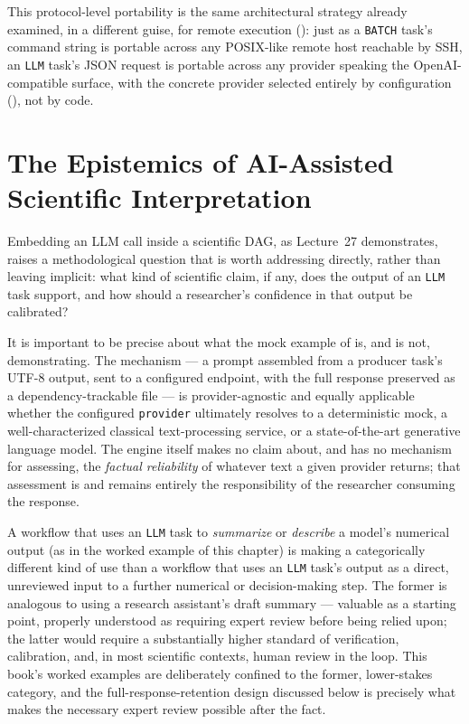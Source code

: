 \begin{practicebox}
This protocol-level portability is the same architectural strategy already
examined, in a different guise, for remote execution
(): just as a \texttt{BATCH} task's command
string is portable across any POSIX-like remote host reachable by SSH, an
\texttt{LLM} task's JSON request is portable across any provider speaking
the OpenAI-compatible surface, with the concrete provider selected entirely
by configuration (), not by code.
\end{practicebox}

\section{The Epistemics of AI-Assisted Scientific Interpretation}

Embedding an LLM call inside a scientific DAG, as Lecture~27 demonstrates,
raises a methodological question that is worth addressing directly, rather
than leaving implicit: what kind of scientific claim, if any, does the
output of an \texttt{LLM} task support, and how should a researcher's
confidence in that output be calibrated?

It is important to be precise about what the mock example of
 is, and is not, demonstrating. The mechanism --- a
prompt assembled from a producer task's UTF-8 output, sent to a configured
endpoint, with the full response preserved as a dependency-trackable file
--- is provider-agnostic and equally applicable whether the configured
\texttt{provider} ultimately resolves to a deterministic mock, a
well-characterized classical text-processing service, or a state-of-the-art
generative language model. The engine itself makes no claim about, and has
no mechanism for assessing, the \emph{factual reliability} of whatever text
a given provider returns; that assessment is and remains entirely the
responsibility of the researcher consuming the response.

\begin{cautionbox}
A workflow that uses an \texttt{LLM} task to \emph{summarize} or
\emph{describe} a model's numerical output (as in the worked example of
this chapter) is making a categorically different kind of use than a
workflow that uses an \texttt{LLM} task's output as a direct, unreviewed
input to a further numerical or decision-making step. The former is
analogous to using a research assistant's draft summary --- valuable as a
starting point, properly understood as requiring expert review before being
relied upon; the latter would require a substantially higher standard of
verification, calibration, and, in most scientific contexts, human review
in the loop. This book's worked examples are deliberately confined to the
former, lower-stakes category, and the full-response-retention design
discussed below is precisely what makes the necessary expert review
possible after the fact.
\end{cautionbox}

